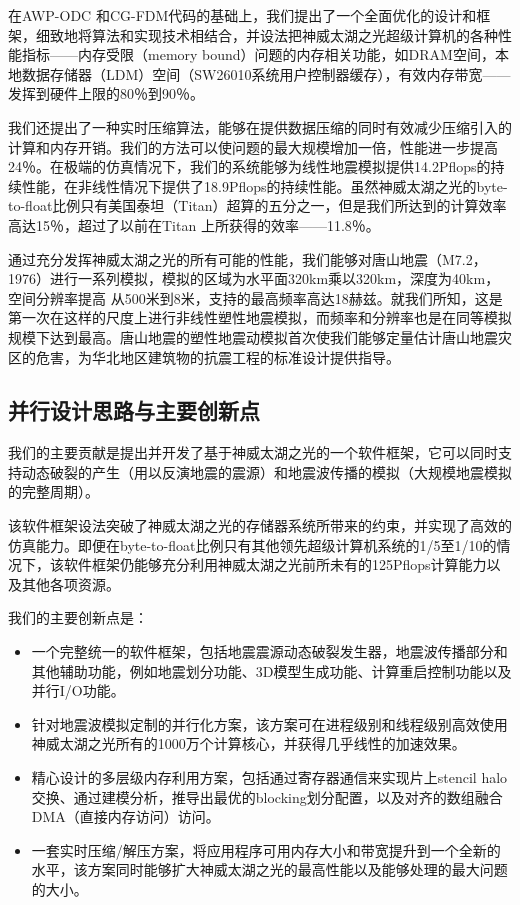 \documentclass[degree=doctor]{thuthesis}
\begin{document}
在AWP-ODC \citep{cui2010scalable}和CG-FDM\citep{zhang2014three}代码的基础上，我们提出了一个全面优化的设计和框架，细致地将算法和实现技术相结合，并设法把神威太湖之光超级计算机的各种性能指标——内存受限（memory bound）问题的内存相关功能，如DRAM空间，本地数据存储器（LDM）空间（SW26010系统用户控制器缓存），有效内存带宽——发挥到硬件上限的80％到90％。

我们还提出了一种实时压缩算法，能够在提供数据压缩的同时有效减少压缩引入的计算和内存开销。我们的方法可以使问题的最大规模增加一倍，性能进一步提高24％。在极端的仿真情况下，我们的系统能够为线性地震模拟提供14.2Pflops的持续性能，在非线性情况下提供了18.9Pflops的持续性能。虽然神威太湖之光的byte-to-float比例只有美国泰坦（Titan）超算的五分之一，但是我们所达到的计算效率高达15％，超过了以前在Titan \citep{roten2016high}上所获得的效率——11.8％。

通过充分发挥神威太湖之光的所有可能的性能，我们能够对唐山地震（M7.2，1976）进行一系列模拟，模拟的区域为水平面320km乘以320km，深度为40km，空间分辨率提高 从500米到8米，支持的最高频率高达18赫兹。就我们所知，这是第一次在这样的尺度上进行非线性塑性地震模拟，而频率和分辨率也是在同等模拟规模下达到最高。唐山地震的塑性地震动模拟首次使我们能够定量估计唐山地震灾区的危害，为华北地区建筑物的抗震工程的标准设计提供指导。

\subsection{并行设计思路与主要创新点}

我们的主要贡献是提出并开发了基于神威太湖之光的一个软件框架，它可以同时支持动态破裂的产生（用以反演地震的震源）和地震波传播的模拟（大规模地震模拟的完整周期）。

该软件框架设法突破了神威太湖之光的存储器系统所带来的约束，并实现了高效的仿真能力。即便在byte-to-float比例只有其他领先超级计算机系统的1/5至1/10的情况下，该软件框架仍能够充分利用神威太湖之光前所未有的125Pflops计算能力以及其他各项资源。

我们的主要创新点是：

\begin{itemize}
\item 一个完整统一的软件框架，包括地震震源动态破裂发生器，地震波传播部分和其他辅助功能，例如地震划分功能、3D模型生成功能、计算重启控制功能以及并行I/O功能。

\item 针对地震波模拟定制的并行化方案，该方案可在进程级别和线程级别高效使用神威太湖之光所有的1000万个计算核心，并获得几乎线性的加速效果。

\item 精心设计的多层级内存利用方案，包括通过寄存器通信来实现片上stencil halo交换、通过建模分析，推导出最优的blocking划分配置，以及对齐的数组融合DMA（直接内存访问）访问。

\item 一套实时压缩/解压方案，将应用程序可用内存大小和带宽提升到一个全新的水平，该方案同时能够扩大神威太湖之光的最高性能以及能够处理的最大问题的大小。
\end{itemize}
\end{document}
